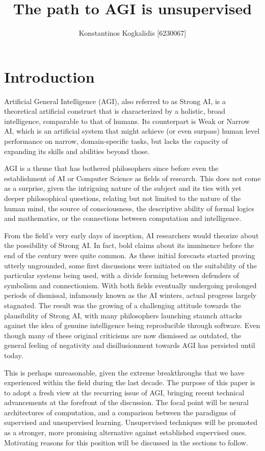 \documentclass[]{article}
\begin{document}
\author{Konstantinos Kogkalidis [6230067]}
\title{The path to AGI is unsupervised}
\maketitle

\section{Introduction}
Artificial General Intelligence (AGI), also referred to as Strong AI, is a theoretical artificial construct that is characterized by a holistic, broad intelligence, comparable to that of humans. Its counterpart is Weak or Narrow AI, which is an artificial system that might achieve (or even surpass) human level performance on narrow, domain-specific tasks, but lacks the capacity of expanding its skills and abilities beyond those.

AGI is a theme that has bothered philosophers since before even the establishment of AI or Computer Science as fields of research. This does not come as a surprise, given the intriguing nature of the subject and its ties with yet deeper philosophical questions, relating but not limited to the nature of the human mind, the source of consciousness, the descriptive ability of formal logics and mathematics, or the connections between computation and intelligence. 

From the field's very early days of inception, AI researchers would theorize about the possibility of Strong AI. In fact, bold claims about its imminence before the end of the century were quite common. As these initial forecasts started proving utterly ungrounded, some first discussions were initiated on the suitability of the particular systems being used, with a divide forming beteween defenders of symbolism and connectionism. With both fields eventually undergoing prolonged periods of dismissal, infamously known as the AI winters, actual progress largely stagnated. The result was the growing of a challenging attitude towards the plausibility of Strong AI, with many philosophers launching staunch attacks against the idea of genuine intelligence being reproducible through software. Even though many of these original criticisms are now dismissed as outdated, the general feeling of negativity and disillusionment towards AGI has persisted until today.

This is perhaps unreasonable, given the extreme breakthroughs that we have experienced within the field during the last decade. The purpose of this paper is to adopt a fresh view at the recurring issue of AGI, bringing recent technical advancements at the forefront of the discussion. The focal point will be neural architectures of computation, and a comparison between the paradigms of supervised and unsupervised learning. Unsupervised techniques will be promoted as a stronger, more promising alternative against established supervised ones. Motivating reasons for this position will be discussed in the sections to follow.
\end{document}
